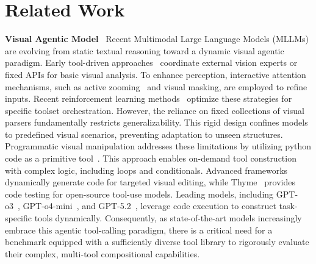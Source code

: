 \documentclass[runningheads]{llncs}
\begin{document}
\section{Related Work}
\noindent \textbf{Visual Agentic Model}~
Recent Multimodal Large Language Models (MLLMs) are evolving from static textual reasoning toward a dynamic visual agentic paradigm. Early tool-driven approaches~\cite{mmreact, zeng2022socratic} coordinate external vision experts or fixed APIs for basic visual analysis. To enhance perception, interactive attention mechanisms, such as active zooming~\cite{shen2025zoomeye, zhang2025adaptive} and visual masking, are employed to refine inputs. Recent reinforcement learning methods~\cite{zheng2025deepeyes, hong2025deepeyesv2, wang2025pixel, su2025openthinkimg, lai2025mini, wang2025monetreasoninglatentvisual,zhou2025reinforced} optimize these strategies for specific toolset orchestration. However, the reliance on fixed collections of visual parsers fundamentally restricts generalizability. This rigid design confines models to predefined visual scenarios, preventing adaptation to unseen structures.
Programmatic visual manipulation addresses these limitations by utilizing python code as a primitive tool~\cite{gupta2023visual, suris2023vipergpt}. This approach enables on-demand tool construction with complex logic, including loops and conditionals. Advanced frameworks~\cite{hu2024visual, fu2025refocus, vinker2025sketchagent, v-thinker, zhao2025pyvision} dynamically generate code for targeted visual editing, while Thyme~\cite{zhang2025thyme} provides code testing for open-source tool-use models. Leading models, including GPT-o3~\cite{openai2025o3o4mini}, GPT-o4-mini~\cite{openai2025o3o4mini}, and GPT-5.2~\cite{openai2025gpt52}, leverage code execution to construct task-specific tools dynamically. 
Consequently, as state-of-the-art models increasingly embrace this agentic tool-calling paradigm, there is a critical need for a benchmark equipped with a sufficiently diverse tool library to rigorously evaluate their complex, multi-tool compositional capabilities.

\end{document}
